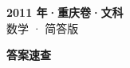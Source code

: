 \documentclass[zihao=-4, a4paper]{ctexart}
\begin{document}
\begin{center}
  {\Large\bfseries 2011 年·重庆卷·文科}\\[4pt]
  {\large 数学 · 简答版}
\end{center}
\medskip
{}

\clearpage
{}
\begin{center}{\Large\bfseries 答案速查}\end{center}
\medskip

\end{document}

